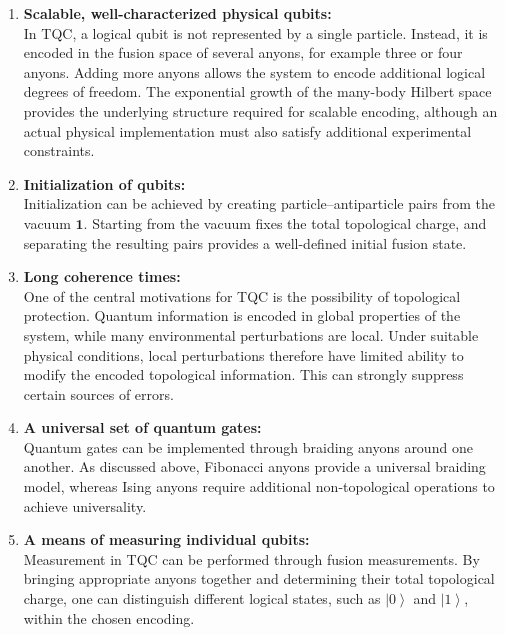 \documentclass[11pt]{article}
\begin{document}
	\begin{enumerate}
		\item \textbf{Scalable, well-characterized physical qubits:} \\
		In TQC, a logical qubit is not represented by a single particle. Instead, it is encoded in the fusion space of several anyons, for example three or four anyons. Adding more anyons allows the system to encode additional logical degrees of freedom. The exponential growth of the many-body Hilbert space provides the underlying structure required for scalable encoding, although an actual physical implementation must also satisfy additional experimental constraints.
		
		\item \textbf{Initialization of qubits:} \\
		Initialization can be achieved by creating particle--antiparticle pairs from the vacuum $\mathbf{1}$. Starting from the vacuum fixes the total topological charge, and separating the resulting pairs provides a well-defined initial fusion state.
		
		\item \textbf{Long coherence times:} \\
		One of the central motivations for TQC is the possibility of topological protection. Quantum information is encoded in global properties of the system, while many environmental perturbations are local. Under suitable physical conditions, local perturbations therefore have limited ability to modify the encoded topological information. This can strongly suppress certain sources of errors.
		
		\item \textbf{A universal set of quantum gates:} \\
		Quantum gates can be implemented through braiding anyons around one another. As discussed above, Fibonacci anyons provide a universal braiding model, whereas Ising anyons require additional non-topological operations to achieve universality.
		
		\item \textbf{A means of measuring individual qubits:} \\
		Measurement in TQC can be performed through fusion measurements. By bringing appropriate anyons together and determining their total topological charge, one can distinguish different logical states, such as $\left|0\right\rangle$ and $\left|1\right\rangle$, within the chosen encoding.
	\end{enumerate}
	
\end{document}
